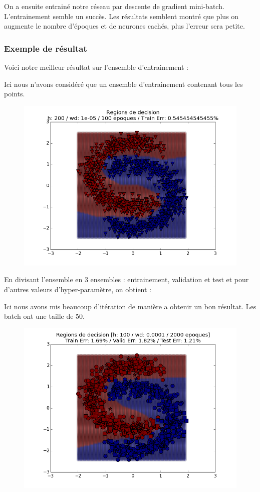 \documentclass[a4paper,11pt]{article}
\begin{document}
On a ensuite entrainé notre réseau par descente de gradient mini-batch.
L'entrainement semble un succès.
Les résultats semblent montré que plus on augmente le nombre d'époques et de neurones cachés, plus l'erreur sera petite.

\subsubsection{Exemple de résultat}


Voici notre meilleur résultat sur l'ensemble d'entrainement :

Ici nous n'avons considéré que un ensemble d'entrainement contenant tous les points.

\begin{figure}[H]
	\includegraphics[width=14cm]{images/exo5-under1.png}
	\centering
	\label{fig:comp}
\end{figure}

En divisant l'ensemble en 3 ensembles : entrainement, validation et test et pour d'autres valeurs d'hyper-paramètre, on obtient :

Ici nous avons mis beaucoup d'itération de manière a obtenir un bon résultat. Les batch ont une taille de 50.
\begin{figure}[H]
	\includegraphics[width=14cm]{images/exo5-ideal.png}
	\centering
	\label{fig:comp}
\end{figure}
\end{document}
